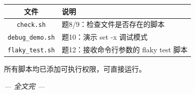 \documentclass[11pt,a4paper]{ctexart}
\newcommand{\code}[1]{\texttt{#1}}
\begin{document}
\begin{table}[h]
\centering
\begin{tabular}{c|l}
\toprule
\textbf{文件} & \textbf{说明} \\
\midrule
\code{check.sh} & 题8/9：检查文件是否存在的脚本 \\
\code{debug\_demo.sh} & 题10：演示 set -x 调试模式 \\
\code{flaky\_test.sh} & 题12：接收命令行参数的 flaky test 脚本 \\
\bottomrule
\end{tabular}
\end{table}

所有脚本均已添加可执行权限，可直接运行。

\vspace{2em}
\begin{center}
\textit{--- 全文完 ---}
\end{center}
\end{document}
